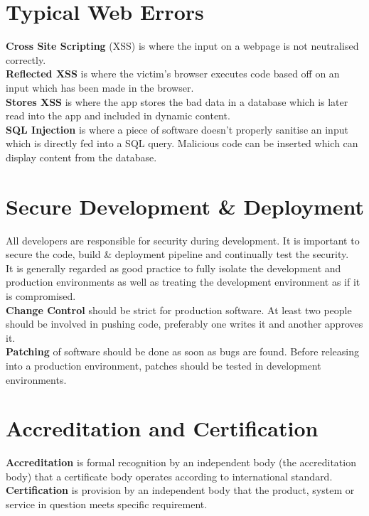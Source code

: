 \documentclass[a4paper,11pt]{article}
\begin{document}
\section{Typical Web Errors}
\textbf{Cross Site Scripting} (XSS) is where the input on a webpage is not neutralised correctly.\\
\textbf{Reflected XSS} is where the victim's browser executes code based off on an input which has been made in the browser.\\
\textbf{Stores XSS} is where the app stores the bad data in a database which is later read into the app and included in dynamic content.\\
\textbf{SQL Injection} is where a piece of software doesn't properly sanitise an input which is directly fed into a SQL query. Malicious code can be inserted which can display content from the database.

\section{Secure Development \& Deployment}
All developers are responsible for security during development. It is important to secure the code, build \& deployment pipeline and continually test the security.\\
It is generally regarded as good practice to fully isolate the development and production environments as well as treating the development environment as if it is compromised.\\
\textbf{Change Control} should be strict for production software. At least two people should be involved in pushing code, preferably one writes it and another approves it.\\
\textbf{Patching} of software should be done as soon as bugs are found. Before releasing into a production environment, patches should be tested in development environments.

\section{Accreditation and Certification}
\textbf{Accreditation} is formal recognition by an independent body (the accreditation body) that a certificate body operates according to international standard.\\
\textbf{Certification} is provision by an independent body that the product, system or service in question meets specific requirement.
\end{document}
